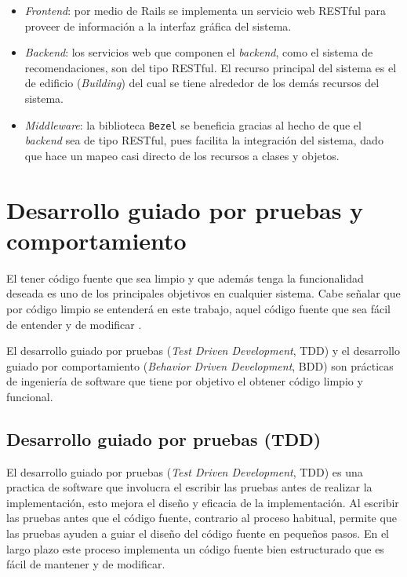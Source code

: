 \begin{itemize}
\item \textit{Frontend}: por medio de Rails se implementa un servicio web RESTful
  para proveer de información a la interfaz gráfica del sistema.
\item \textit{Backend}: los servicios web que componen el \textit{backend}, como el
  sistema de recomendaciones, son del tipo RESTful. El recurso principal del sistema
  es el de edificio (\textit{Building}) del cual se tiene alrededor de los demás
  recursos del sistema.
\item \textit{Middleware}: la biblioteca \texttt{Bezel} se beneficia gracias al hecho
  de que el \textit{backend} sea de tipo RESTful, pues facilita la integración del
  sistema, dado que hace un mapeo casi directo de los recursos a clases y objetos.

\end{itemize}


\section{Desarrollo guiado por pruebas y comportamiento}
El tener código fuente que sea limpio y que además tenga la funcionalidad deseada
es uno de los principales objetivos en cualquier sistema. Cabe señalar que
por código limpio se entenderá en este trabajo, aquel código fuente que sea fácil
de entender y de modificar \cite{4_beck_2003}.

El desarrollo guiado por pruebas (\textit{Test Driven Development}, TDD) y el
desarrollo guiado por comportamiento (\textit{Behavior Driven Development}, BDD)
son prácticas de ingeniería de software que tiene por objetivo el obtener código
limpio y funcional.

\subsection{Desarrollo guiado por pruebas (TDD)}
El desarrollo guiado por pruebas (\textit{Test Driven Development}, TDD) es una
practica de software que involucra el escribir las pruebas antes de
realizar la implementación, esto mejora el diseño y eficacia de la implementación.
Al escribir las pruebas antes que el código fuente, contrario al proceso habitual,
permite que las pruebas ayuden a guiar el diseño del código fuente en pequeños
pasos. En el largo plazo este proceso implementa un código fuente bien
estructurado que es fácil de mantener y de modificar\cite{4_beck_2003}.

